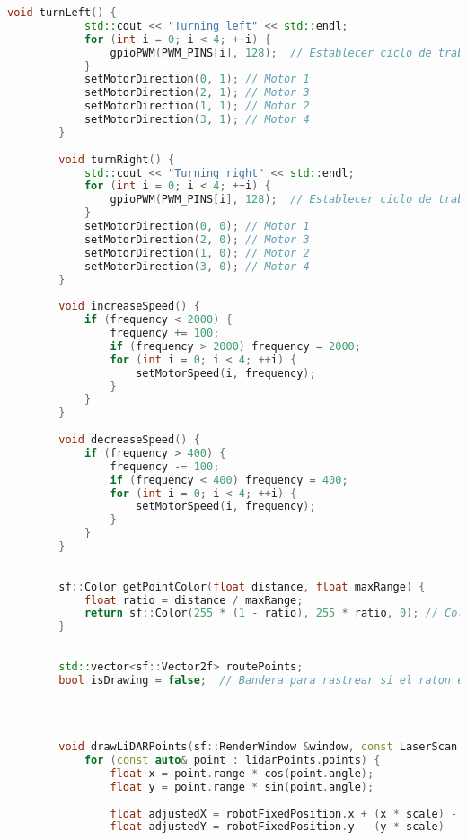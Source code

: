 \begin{lstlisting}[language={C++}, caption={Quinto ajuste de c\'odigo}, label={QuintoAjuste}]
        void turnLeft() {
            std::cout << "Turning left" << std::endl;
            for (int i = 0; i < 4; ++i) {
                gpioPWM(PWM_PINS[i], 128);  // Establecer ciclo de trabajo al 50%
            }
            setMotorDirection(0, 1); // Motor 1
            setMotorDirection(2, 1); // Motor 3
            setMotorDirection(1, 1); // Motor 2
            setMotorDirection(3, 1); // Motor 4
        }
        
        void turnRight() {
            std::cout << "Turning right" << std::endl;
            for (int i = 0; i < 4; ++i) {
                gpioPWM(PWM_PINS[i], 128);  // Establecer ciclo de trabajo al 50%
            }
            setMotorDirection(0, 0); // Motor 1
            setMotorDirection(2, 0); // Motor 3
            setMotorDirection(1, 0); // Motor 2
            setMotorDirection(3, 0); // Motor 4
        }
        
        void increaseSpeed() {
            if (frequency < 2000) {
                frequency += 100;
                if (frequency > 2000) frequency = 2000;
                for (int i = 0; i < 4; ++i) {
                    setMotorSpeed(i, frequency);
                }
            }
        }
        
        void decreaseSpeed() {
            if (frequency > 400) {
                frequency -= 100;
                if (frequency < 400) frequency = 400;
                for (int i = 0; i < 4; ++i) {
                    setMotorSpeed(i, frequency);
                }
            }
        }
        
        
        sf::Color getPointColor(float distance, float maxRange) {
            float ratio = distance / maxRange;
            return sf::Color(255 * (1 - ratio), 255 * ratio, 0); // Color de rojo a verde
        }
        
        
        std::vector<sf::Vector2f> routePoints;
        bool isDrawing = false;  // Bandera para rastrear si el raton esta presionado
        
        
        
        
        void drawLiDARPoints(sf::RenderWindow &window, const LaserScan &lidarPoints, const sf::Vector2f &robotPosition, float scale, float max_range) {
            for (const auto& point : lidarPoints.points) {
                float x = point.range * cos(point.angle);
                float y = point.range * sin(point.angle);
        
                float adjustedX = robotFixedPosition.x + (x * scale) - robotPosition.x;
                float adjustedY = robotFixedPosition.y - (y * scale) - robotPosition.y;  // Invertir Y para la pantalla
        

\end{lstlisting}
